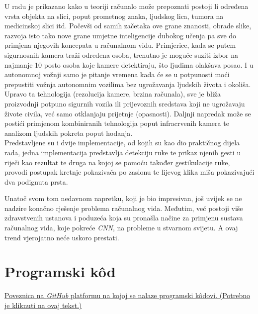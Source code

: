 \documentclass[]{foi} %
\begin{document}
U radu je prikazano kako u teoriji računalo može prepoznati postoji li određena vrsta objekta na slici, poput prometnog znaka, ljudskog lica, tumora na medicinskoj slici itd. Počevši od samih začetaka ove grane znanosti, obrade slike, razvoja isto tako nove grane umjetne inteligencije dubokog učenja pa sve do primjena njegovih koncepata u računalnom vidu. Primjerice, kada se putem sigurnosnih kamera traži određena osoba, trenutno je moguće suziti izbor na najmanje 10 posto osoba koje kamere detektiraju, što ljudima olakšava posao. I u autonomnoj vožnji samo je pitanje vremena kada će se u potpunosti moći prepustiti vožnja autonomnim vozilima bez ugrožavanja ljudskih života i okoliša.\\
Upravo ta tehnologija (rezolucija kamere, brzina računala), sve je bliža proizvodnji potpuno sigurnih vozila ili prijevoznih sredstava koji ne ugrožavaju živote civila, već samo otklanjaju prijetnje (opasnosti). Daljnji napredak može se postići primjenom kombiniranih tehnologija poput infracrvenih kamera te analizom ljudskih pokreta poput hodanja.\\
Predstavljene su i dvije implementacije, od kojih su kao dio praktičnog dijela rada, jedna implementacija predstavlja detekciju ruke te prikaz njenih gesti u riječi kao rezultat te druga na kojoj se pomoću također gestikulacije ruke, provodi postupak kretnje pokazivača po zaslonu te lijevog klika miša pokazivajući dva podignuta prsta.

Unatoč svom tom nedavnom napretku, koji je bio impresivan, još uvijek se ne nadzire konačno rješenje problema računalnog vida. Međutim, već postoji više zdravstvenih ustanova i poduzeća koja su pronašla načine za primjenu sustava računalnog vida, koje pokreće \textit{CNN}, na probleme u stvarnom svijetu. A ovaj trend vjerojatno neće uskoro prestati.

\makebackmatter

\appendices

\chapter{Programski kôd}

\href{https://github.com/pmatisic/zavrsni}{Poveznica na \textit{GitHub} platformu na kojoj se nalaze programski kôdovi. (Potrebno je kliknuti na ovaj tekst.)}
\end{document}
